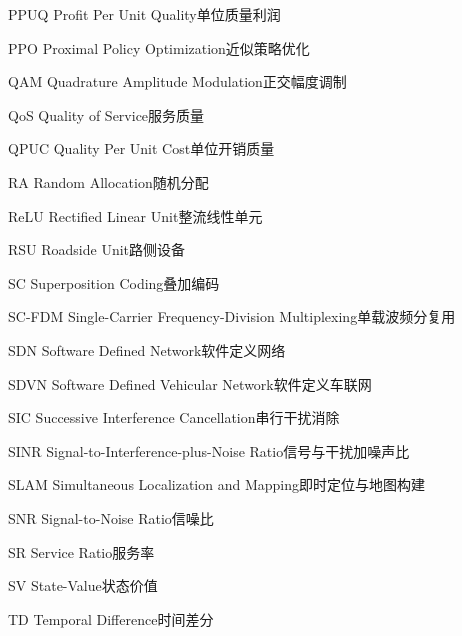 \begin{abbreviate}[0mm][18mm]
\item[PPUQ] Profit Per Unit Quality\hspace{1em}单位质量利润
\item[PPO] Proximal Policy Optimization\hspace{1em}近似策略优化
\item[QAM] Quadrature Amplitude Modulation\hspace{1em}正交幅度调制
\item[QoS] Quality of Service\hspace{1em}服务质量
\item[QPUC] Quality Per Unit Cost\hspace{1em}单位开销质量
\item[RA] Random Allocation\hspace{1em}随机分配
\item[ReLU] Rectified Linear Unit\hspace{1em}整流线性单元
\item[RSU] Roadside Unit\hspace{1em}路侧设备
\item[SC] Superposition Coding\hspace{1em}叠加编码
\item[SC-FDM] Single-Carrier Frequency-Division Multiplexing\hspace{1em}单载波频分复用
\item[SDN] Software Defined Network\hspace{1em}软件定义网络
\item[SDVN] Software Defined Vehicular Network\hspace{1em}软件定义车联网
\item[SIC] Successive Interference Cancellation\hspace{1em}串行干扰消除
\item[SINR] Signal-to-Interference-plus-Noise Ratio\hspace{1em}信号与干扰加噪声比
\item[SLAM] Simultaneous Localization and Mapping\hspace{1em}即时定位与地图构建
\item[SNR] Signal-to-Noise Ratio\hspace{1em}信噪比
\item[SR] Service Ratio\hspace{1em}服务率
\item[SV] State-Value\hspace{1em}状态价值
\item[TD] Temporal Difference\hspace{1em}时间差分

\end{abbreviate}
